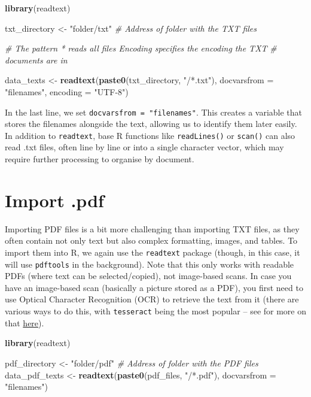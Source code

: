 \documentclass[
]{book}
\newenvironment{Shaded}{\begin{snugshade}}{\end{snugshade}}
\newcommand{\AttributeTok}[1]{\textcolor[rgb]{0.13,0.29,0.53}{#1}}
\newcommand{\CommentTok}[1]{\textcolor[rgb]{0.56,0.35,0.01}{\textit{#1}}}
\newcommand{\FunctionTok}[1]{\textcolor[rgb]{0.13,0.29,0.53}{\textbf{#1}}}
\newcommand{\NormalTok}[1]{#1}
\newcommand{\OtherTok}[1]{\textcolor[rgb]{0.56,0.35,0.01}{#1}}
\newcommand{\StringTok}[1]{\textcolor[rgb]{0.31,0.60,0.02}{#1}}
\begin{document}
\begin{Shaded}
\begin{Highlighting}[]
\FunctionTok{library}\NormalTok{(readtext)}

\NormalTok{txt\_directory }\OtherTok{\textless{}{-}} \StringTok{"folder/txt"}  \CommentTok{\# Address of folder with the TXT files}

\CommentTok{\# The pattern \textquotesingle{}*\textquotesingle{} reads all files Encoding specifies the encoding the TXT}
\CommentTok{\# documents are in}

\NormalTok{data\_texts }\OtherTok{\textless{}{-}} \FunctionTok{readtext}\NormalTok{(}\FunctionTok{paste0}\NormalTok{(txt\_directory, }\StringTok{"/*.txt"}\NormalTok{), }\AttributeTok{docvarsfrom =} \StringTok{"filenames"}\NormalTok{,}
    \AttributeTok{encoding =} \StringTok{"UTF{-}8"}\NormalTok{)}
\end{Highlighting}
\end{Shaded}

In the last line, we set \texttt{docvarsfrom\ =\ "filenames"}. This creates a variable that stores the filenames alongside the text, allowing us to identify them later easily. In addition to \texttt{readtext}, base R functions like \texttt{readLines()} or \texttt{scan()} can also read .txt files, often line by line or into a single character vector, which may require further processing to organise by document.

\section{Import .pdf}\label{import-.pdf}

Importing PDF files is a bit more challenging than importing TXT files, as they often contain not only text but also complex formatting, images, and tables. To import them into R, we again use the \texttt{readtext} package (though, in this case, it will use \texttt{pdftools} in the background). Note that this only works with readable PDFs (where text can be selected/copied), not image-based scans. In case you have an image-based scan (basically a picture stored as a PDF), you first need to use Optical Character Recognition (OCR) to retrieve the text from it (there are various ways to do this, with \texttt{tesseract} being the most popular -- see for more on that \href{https://github.com/tesseract-ocr/tesseract}{here}).

\begin{Shaded}
\begin{Highlighting}[]
\FunctionTok{library}\NormalTok{(readtext)}

\NormalTok{pdf\_directory }\OtherTok{\textless{}{-}} \StringTok{"folder/pdf"}  \CommentTok{\# Address of folder with the PDF files}
\NormalTok{data\_pdf\_texts }\OtherTok{\textless{}{-}} \FunctionTok{readtext}\NormalTok{(}\FunctionTok{paste0}\NormalTok{(pdf\_files, }\StringTok{"/*.pdf"}\NormalTok{), }\AttributeTok{docvarsfrom =} \StringTok{"filenames"}\NormalTok{)}
\end{Highlighting}
\end{Shaded}
\end{document}
